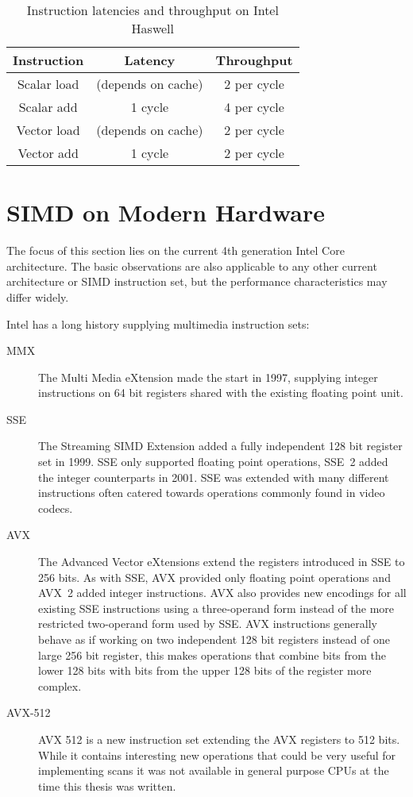 \begin{table}\center
\begin{tabular}{c|c|c}
Instruction & Latency & Throughput\\
\hline
Scalar load & (depends on cache) & 2 per cycle\\
Scalar add & 1 cycle & 4 per cycle\\
Vector load & (depends on cache) & 2 per cycle\\
Vector add & 1 cycle & 2 per cycle\\
\end{tabular}
\caption{Instruction latencies and throughput on Intel Haswell}
\label{tab:latencies}
\end{table}

\section{SIMD on Modern Hardware}

The focus of this section lies on the current 4th generation Intel Core
architecture. The basic observations are also applicable to any other current
architecture or SIMD instruction set, but the performance characteristics may
differ widely.

Intel has a long history supplying multimedia instruction sets:
\begin{description}
\item[MMX] The Multi Media eXtension made the start in 1997, supplying integer
instructions on 64 bit registers shared with the existing floating point unit.
\item[SSE] The Streaming SIMD Extension added a fully independent 128 bit
register set in 1999. SSE only supported floating point operations, SSE~2 added
the integer counterparts in 2001. SSE was extended with many different
instructions often catered towards operations commonly found in video codecs.
\item[AVX] The Advanced Vector eXtensions extend the registers introduced in
SSE to 256 bits. As with SSE, AVX provided only floating point operations and
AVX~2 added integer instructions. AVX also provides new encodings for all
existing SSE instructions using a three-operand form instead of the more
restricted two-operand form used by SSE. AVX instructions generally behave as
if working on two independent 128 bit registers instead of one large 256 bit
register, this makes operations that combine bits from the lower 128 bits with
bits from the upper 128 bits of the register more complex.
\item[AVX-512] AVX 512 is a new instruction set extending the AVX registers to
512 bits. While it contains interesting new operations that could be very
useful for implementing scans it was not available in general purpose CPUs at
the time this thesis was written.
\end{description}

